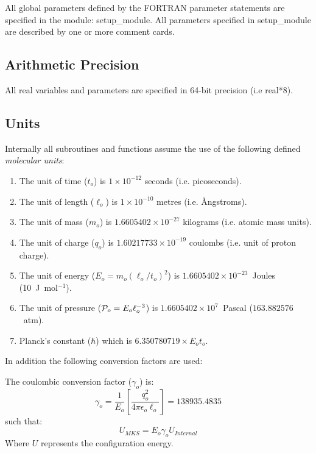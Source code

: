 All global parameters defined by the FORTRAN
parameter statements are specified in the module: {\sc
setup\_module}. All parameters specified in {\sc setup\_module}
are described by one or more comment cards.

\subsection{Arithmetic Precision}

All real variables and parameters are specified in 64-bit precision
(i.e real*8).

\subsection{Units}
\label{units}
Internally all \D{} subroutines and functions assume the use of the
following defined {\em molecular units}:

\begin{enumerate}

\item The unit of time ($t_{o}$) is $1\times 10^{-12}$ seconds (i.e. picoseconds).
\item The unit of length ($\ell_{o}$) is $1\times 10^{-10}$ metres
(i.e. \AA ngstroms).
\item  The unit of mass ($m_{o}$) is $1.6605402\times 10^{-27}$
kilograms (i.e. atomic mass units).
\item The unit of charge ($q_{o}$) is $1.60217733\times 10^{-19}$
coulombs (i.e. unit of proton charge).
\item The unit of energy ($E_{o}=m_{o}(\ell_{o}/t_{o})^{2}$) is 
$1.6605402\times 10^{-23}$~Joules (10~J~mol$^{-1}$).
\item The unit of pressure (${\cal P}_{o}=E_{o}\ell_{o}^{-3}$) is 
$1.6605402\times 10^{7}$~Pascal ($163.882576$~atm).
\item Planck's constant ($\hbar$) which is $6.350780719\times E_{o}t_{o}$.
\end{enumerate}

\noindent In addition the following conversion factors are used:

\noindent The coulombic conversion factor ($\gamma_{o}$) is:
\[\gamma_{o}=\frac{1}{E_{o}} \left [
\frac{q_{o}^{2}}{4\pi\epsilon_{o}\ell_{o}}\right ]= 138935.4835 \]
such that:
\[U_{MKS}=E_{o}\gamma_{o}U_{Internal}\]
Where $U$ represents the configuration energy.

